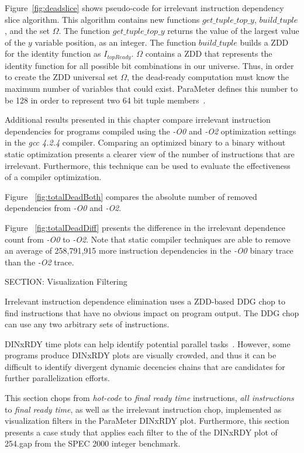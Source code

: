 {Figure~\ref{fig:deadslice} shows pseudo-code for irrelevant instruction dependency slice algorithm.  This algorithm contains new functions $get\_tuple\_top\_y$, $build\_tuple$, and the set $\Omega$. The function $get\_tuple\_top\_y$ returns the value of the largest value of the $y$ variable position, as an integer.  The function $build\_tuple$ builds a ZDD for the identity function as $I_{topReady}$.  $\Omega$ contains a ZDD that represents the identity function for all possible bit combinations in our universe.  Thus, in order to create the ZDD universal set $\Omega$, the dead-ready computation must know the maximum number of variables that could exist.  ParaMeter defines this number to be 128 in order to represent two 64 bit tuple members~\cite{price:10:cgo}.

Additional results presented in this chapter compare irrelevant instruction dependencies for programs compiled using the \textit{-O0} and \textit{-O2} optimization settings in the \textit{gcc 4.2.4} compiler.  Comparing an optimized binary to a binary without static optimization presents a clearer view of the number of instructions that are irrelevant.  Furthermore, this technique can be used to evaluate the effectiveness of a compiler optimization.

Figure ~\ref{fig:totalDeadBoth} compares the absolute number of removed dependencies from \textit{-O0} and \textit{-O2}.

Figure ~\ref{fig:totalDeadDiff} presents the difference in the irrelevant dependence count from \textit{-O0} to \textit{-O2}. Note that static compiler techniques are able to remove an average of 258,791,915 more instruction dependencies in the \textit{-O0} binary trace than the \textit{-O2} trace.

SECTION: Visualization Filtering


Irrelevant instruction dependence elimination uses a ZDD-based DDG chop to find instructions that have no obvious impact on program output.  The DDG chop can use any two arbitrary sets of instructions.

DINxRDY time plots can help identify potential parallel tasks~\cite{price:08:pact}.  However, some programs produce DINxRDY plots are visually crowded, and thus it can be difficult to identify divergent dynamic decencies chains that are candidates for further parallelization efforts.

This section chops from \textit{hot-code} to \textit{final ready time} instructions, \textit{all instructions} to \textit{final ready time}, as well as the irrelevant instruction chop, implemented as visualization filters in the ParaMeter DINxRDY plot. Furthermore, this section presents a case study that applies each filter to the of the DINxRDY plot of 254.gap from the SPEC 2000 integer benchmark.

}
